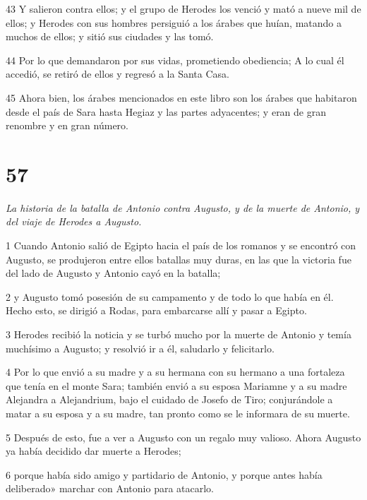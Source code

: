 \par 43 Y salieron contra ellos; y el grupo de Herodes los venció y mató a nueve mil de ellos; y Herodes con sus hombres persiguió a los árabes que huían, matando a muchos de ellos; y sitió sus ciudades y las tomó.

\par 44 Por lo que demandaron por sus vidas, prometiendo obediencia; A lo cual él accedió, se retiró de ellos y regresó a la Santa Casa.

\par 45 Ahora bien, los árabes mencionados en este libro son los árabes que habitaron desde el país de Sara hasta Hegiaz y las partes adyacentes; y eran de gran renombre y en gran número.


\chapter{57}

\par \textit{La historia de la batalla de Antonio contra Augusto, y de la muerte de Antonio, y del viaje de Herodes a Augusto.}

\par 1 Cuando Antonio salió de Egipto hacia el país de los romanos y se encontró con Augusto, se produjeron entre ellos batallas muy duras, en las que la victoria fue del lado de Augusto y Antonio cayó en la batalla;

\par 2 y Augusto tomó posesión de su campamento y de todo lo que había en él. Hecho esto, se dirigió a Rodas, para embarcarse allí y pasar a Egipto.

\par 3 Herodes recibió la noticia y se turbó mucho por la muerte de Antonio y temía muchísimo a Augusto; y resolvió ir a él, saludarlo y felicitarlo.

\par 4 Por lo que envió a su madre y a su hermana con su hermano a una fortaleza que tenía en el monte Sara; también envió a su esposa Mariamne y a su madre Alejandra a Alejandrium, bajo el cuidado de Josefo de Tiro; conjurándole a matar a su esposa y a su madre, tan pronto como se le informara de su muerte.

\par 5 Después de esto, fue a ver a Augusto con un regalo muy valioso. Ahora Augusto ya había decidido dar muerte a Herodes;

\par 6 porque había sido amigo y partidario de Antonio, y porque antes había deliberado» marchar con Antonio para atacarlo.

